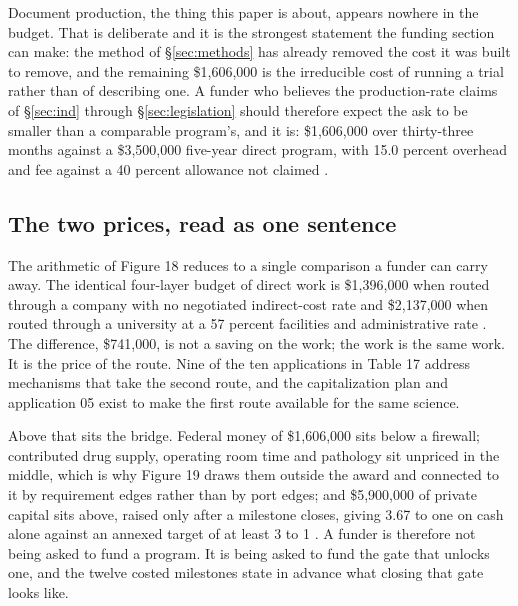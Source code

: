 Document production, the thing this paper is about, appears nowhere in the
budget. That is deliberate and it is the strongest statement the funding section
can make: the method of \S\ref{sec:methods} has already removed the cost it was
built to remove, and the remaining \$1,606,000 is the irreducible cost of
running a trial rather than of describing one. A funder who believes the
production-rate claims of \S\ref{sec:ind} through \S\ref{sec:legislation} should
therefore expect the ask to be smaller than a comparable program's, and it is:
\$1,606,000 over thirty-three months against a \$3,500,000 five-year direct
program, with 15.0 percent overhead and fee against a 40 percent allowance not
claimed \cite{capplan2026}.

\subsection{The two prices, read as one sentence}

The arithmetic of Figure 18 reduces to a single comparison a funder can carry
away. The identical four-layer budget of direct work is \$1,396,000 when routed
through a company with no negotiated indirect-cost rate and \$2,137,000 when
routed through a university at a 57 percent facilities and administrative rate
\cite{capplan2026}. The difference, \$741,000, is not a saving on the work; the
work is the same work. It is the price of the route. Nine of the ten
applications in Table 17 address mechanisms that take the second route, and the
capitalization plan and application 05 exist to make the first route available
for the same science.

Above that sits the bridge. Federal money of \$1,606,000 sits below a firewall;
contributed drug supply, operating room time and pathology sit unpriced in the
middle, which is why Figure 19 draws them outside the award and connected to it
by requirement edges rather than by port edges; and \$5,900,000 of private
capital sits above, raised only after a milestone closes, giving 3.67 to one on
cash alone against an annexed target of at least 3 to 1
\cite{capplan2026, kratsiosvought2026fy2028priorities}. A funder is therefore
not being asked to fund a program. It is being asked to fund the gate that
unlocks one, and the twelve costed milestones state in advance what closing that
gate looks like.
